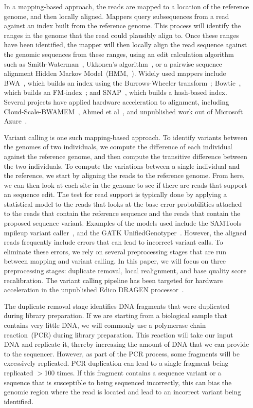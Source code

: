 \documentclass[phd]{ucbthesis}
\begin{document}
In a mapping-based approach, the reads are mapped to a location of the reference
genome, and then locally aligned. Mappers query subsequences from a read against
an index built from the reference genome. This process will identify the ranges
in the genome that the read could plausibly align to. Once these ranges have
been identified, the mapper will then locally align the read sequence against
the genomic sequences from these ranges, using an edit calculation algorithm such
as Smith-Waterman~\cite{smith81}, Ukkonen's algorithm~\cite{ukkonen85}, or a
pairwise sequence alignment Hidden Markov Model~(HMM,~\cite{durbin98}). Widely
used mappers include {BWA}~\cite{li09}, which builds an index using the
Burrows-Wheeler transform~\cite{burrows94}; {Bowtie}~\cite{langmead09bowtie},
which builds an FM-index~\cite{ferragina00}; and {SNAP}~\cite{zaharia11},
which builds a hash-based index. Several projects have applied hardware acceleration
to alignment, including {Cloud-Scale-BWAMEM}~\cite{chen16, chen15}, Ahmed
et al~\cite{ahmed15}, and unpublished work out of Microsoft
Azure~\cite{msr16}.

Variant calling is one such mapping-based approach. To identify variants between
the genomes of two individuals, we compute the difference of each individual
against the reference genome, and then compute the transitive difference between
the two individuals. To compute the variations between a single individual and
the reference, we start by aligning the reads to the reference genome. From
here, we can then look at each site in the genome to see if there are reads that
support an sequence edit. The test for read support is typically done by applying a statistical model
to the reads that looks at the base error probabilities attached to the reads
that contain the reference sequence and the reads that contain the proposed
sequence variant. Examples of the models used include the {SAMTools
mpileup} variant caller~\cite{li11}, and the {GATK
UnifiedGenotyper}~\cite{depristo11}. However, the aligned reads frequently
include errors that can lead to incorrect variant calls. To eliminate these
errors, we rely on several preprocessing stages that are run between mapping and
variant calling. In this paper, we will focus on three preprocessing stages:
duplicate removal, local realignment, and base quality score recalibration.
The variant calling pipeline has been targeted for hardware acceleration in the
unpublished Edico {DRAGEN} processor~\cite{dragen}.

The duplicate removal stage identifies DNA fragments that were duplicated during
library preparation. If we are starting from a biological sample that contains
very little DNA, we will commonly use a polymerase chain reaction~(PCR) during
library preparation. This reaction will take our input DNA and replicate it,
thereby increasing the amount of DNA that we can provide to the sequencer.
However, as part of the PCR process, some fragments will be excessively
replicated. PCR duplication can lead to a single fragment being replicated $>$100 times. If
this fragment contains a sequence variant or a sequence that is susceptible to
being sequenced incorrectly, this can bias the genomic region where the read is
located and lead to an incorrect variant being identified.
\end{document}
